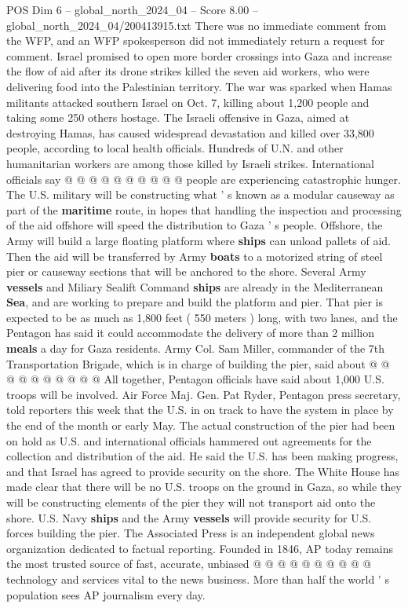 \begin{textsample}{POS Dim 6 – global\_north\_2024\_04 – Score 8.00 – global\_north\_2024\_04/200413915.txt}
There was no immediate comment from the WFP, and an WFP spokesperson did not immediately return a request for comment.
Israel promised to open more border crossings into Gaza and increase the flow of aid after its drone strikes killed the seven aid workers, who were delivering food into the Palestinian territory.
The war was sparked when Hamas militants attacked southern Israel on Oct. 7, killing about 1,200 people and taking some 250 others hostage.
The Israeli offensive in Gaza, aimed at destroying Hamas, has caused widespread devastation and killed over 33,800 people, according to local health officials.
Hundreds of U.N. and other humanitarian workers are among those killed by Israeli strikes.
International officials say @ @ @ @ @ @ @ @ @ @ people are experiencing catastrophic hunger.
The U.S. military will be constructing what ' s known as a modular causeway as part of the \textbf{maritime} route, in hopes that handling the inspection and processing of the aid offshore will speed the distribution to Gaza ' s people.
Offshore, the Army will build a large floating platform where \textbf{ships} can unload pallets of aid.
Then the aid will be transferred by Army \textbf{boats} to a motorized string of steel pier or causeway sections that will be anchored to the shore.
Several Army \textbf{vessels} and Miliary Sealift Command \textbf{ships} are already in the Mediterranean \textbf{Sea}, and are working to prepare and build the platform and pier.
That pier is expected to be as much as 1,800 feet ( 550 meters ) long, with two lanes, and the Pentagon has said it could accommodate the delivery of more than 2 million \textbf{meals} a day for Gaza residents.
Army Col.
Sam Miller, commander of the 7th Transportation Brigade, which is in charge of building the pier, said about @ @ @ @ @ @ @ @ @ @ All together, Pentagon officials have said about 1,000 U.S. troops will be involved.
Air Force Maj.
Gen.
Pat Ryder, Pentagon press secretary, told reporters this week that the U.S. in on track to have the system in place by the end of the month or early May.
The actual construction of the pier had been on hold as U.S. and international officials hammered out agreements for the collection and distribution of the aid.
He said the U.S. has been making progress, and that Israel has agreed to provide security on the shore.
The White House has made clear that there will be no U.S. troops on the ground in Gaza, so while they will be constructing elements of the pier they will not transport aid onto the shore.
U.S.
Navy \textbf{ships} and the Army \textbf{vessels} will provide security for U.S. forces building the pier.
The Associated Press is an independent global news organization dedicated to factual reporting.
Founded in 1846, AP today remains the most trusted source of fast, accurate, unbiased @ @ @ @ @ @ @ @ @ @ technology and services vital to the news business.
More than half the world ' s population sees AP journalism every day.

\end{textsample}
